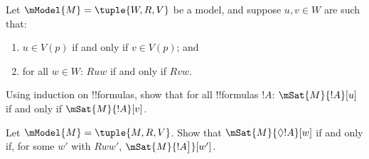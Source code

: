 \documentclass[../../../include/open-logic-section]{subfiles}
\begin{document}
\begin{prob}
  Let $\mModel{M} = \tuple{W, R, V}$ be a model, and suppose $u, v \in
  W$ are such that:
  \begin{enumerate}
  \item $u \in V(p)$ if and only if $v \in V(p)$; and
  \item for all $w \in W$: $Ruw$ if and only if $Rvw$.
  \end{enumerate}
  Using induction on !!{formula}s, show that for all !!{formula}s $!A$:
  $\mSat{M}{!A}[u]$ if and only if $\mSat{M}{!A}[v]$.
\end{prob}

\begin{prob}
  Let $\mModel{M} = \tuple{M, R, V}$. Show that $\mSat{M}{\Diamond !A}[w]$ if
  and only if, for some $w'$ with $Rww'$, $\mSat{M}{!A\bigr]}[w']$.
\end{prob}
\end{document}
